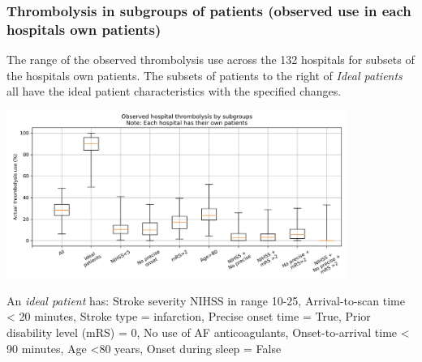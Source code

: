 \documentclass{beamer}
\begin{document}

\begin{frame}
\frametitle{Thrombolysis in subgroups of patients (observed use in each hospitals own patients)}

\footnotesize The range of the observed thrombolysis use across the 132 hospitals for subsets of the hospitals own patients. The subsets of patients to the right of \emph{Ideal patients} all have the ideal patient characteristics with the specified changes.

\begin{center}
\includegraphics[width=0.83\textwidth]{./images/15b_actual_subgroup_violin.jpg}
\end{center}


\scriptsize An \emph{ideal patient} has: Stroke severity NIHSS in range 10-25, Arrival-to-scan time \textless{} 20 minutes, Stroke type = infarction, Precise onset time = True, Prior disability level (mRS) = 0, No use of AF anticoagulants, Onset-to-arrival time \textless{} 90 minutes, Age \textless{80 years}, Onset during sleep = False
\end{frame}

\end{document}
